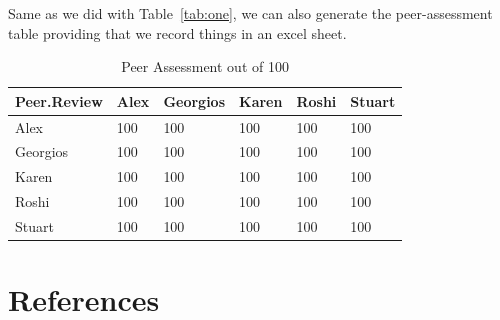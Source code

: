 \documentclass[10pt]{article}\usepackage[]{graphicx}\usepackage[]{color}
\begin{document}

Same as we did with Table~\ref{tab:one}, we can also generate the peer-assessment table providing that we record things in an excel sheet. 

\begin{table}[ht]
\centering
\caption{Peer Assessment out of 100} 
\label{tab:two}
\begin{tabular}{llllll}
  \hline
Peer.Review & Alex & Georgios & Karen & Roshi & Stuart \\ 
  \hline
Alex & 100 & 100 & 100 & 100 & 100 \\ 
  Georgios & 100 & 100 & 100 & 100 & 100 \\ 
  Karen & 100 & 100 & 100 & 100 & 100 \\ 
  Roshi & 100 & 100 & 100 & 100 & 100 \\ 
  Stuart & 100 & 100 & 100 & 100 & 100 \\ 
   \hline
\end{tabular}
\end{table}




\section*{References}\label{pubs}
\printbibliography[heading =none]
\end{document}
